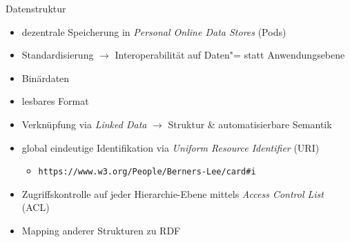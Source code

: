\begin{frame}{Datenstruktur}
    \begin{itemize}
        \item dezentrale Speicherung in \emph{Personal Online Data Stores} (Pods)~\cite{mecklerWebLinkedData2023,sambraSolidPlatformDecentralized2016}
        \item Standardisierung $\to$ Interoperabilität auf Daten"= statt Anwendungsebene
        
        \item Binärdaten 
        
        \pause
        \pause
        \item lesbares Format 
        
        \pause
        \pause
        \item Verknüpfung via \emph{Linked Data} $\to$ Struktur \& automatisierbare Semantik~\cite{bizerLinkedDataStory2009,mecklerWebLinkedData2023}

        \pause
        \item global eindeutige Identifikation via \emph{Uniform Resource Identifier} (URI)~\cite{sambraSolidPlatformDecentralized2016}
        \begin{itemize}
            \item \texttt{https://www.w3.org/People/Berners-Lee/card\#i}~\cite{bizerLinkedDataStory2009}
        \end{itemize}
        
        \pause
        \item Zugriffskontrolle auf jeder Hierarchie-Ebene mittels \emph{Access Control List} (ACL)
        
        \pause
        \item Mapping anderer Strukturen zu RDF~\cite{mecklerWebLinkedData2023,sambraSolidPlatformDecentralized2016}
    \end{itemize}
\end{frame}


